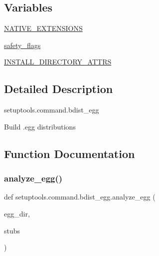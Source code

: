 \subsection*{Variables}
\begin{DoxyCompactItemize}
\item 
\hyperlink{namespacesetuptools_1_1command_1_1bdist__egg_a0cf06b567bd34638c4533f36c5c90c25}{N\+A\+T\+I\+V\+E\+\_\+\+E\+X\+T\+E\+N\+S\+I\+O\+NS}
\item 
\hyperlink{namespacesetuptools_1_1command_1_1bdist__egg_ae431f77cc43a166037e4dc69360e1588}{safety\+\_\+flags}
\item 
\hyperlink{namespacesetuptools_1_1command_1_1bdist__egg_a6d723aa3b4e5f0b90971b089272cb1b0}{I\+N\+S\+T\+A\+L\+L\+\_\+\+D\+I\+R\+E\+C\+T\+O\+R\+Y\+\_\+\+A\+T\+T\+RS}
\end{DoxyCompactItemize}


\subsection{Detailed Description}
\begin{DoxyVerb}setuptools.command.bdist_egg

Build .egg distributions\end{DoxyVerb}
 

\subsection{Function Documentation}
\mbox{\label{namespacesetuptools_1_1command_1_1bdist__egg_a006cd7effcbb632204ea3f7f23e751d5}} 
\subsubsection{\texorpdfstring{analyze\+\_\+egg()}{analyze\_egg()}}
{\footnotesize\ttfamily def setuptools.\+command.\+bdist\+\_\+egg.\+analyze\+\_\+egg (\begin{DoxyParamCaption}\item[{}]{egg\+\_\+dir,  }\item[{}]{stubs }\end{DoxyParamCaption})}

